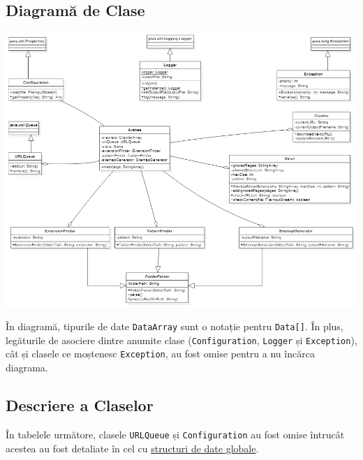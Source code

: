\documentclass[12pt]{article}
\begin{document}
\subsection{Diagramă de Clase}

\begin{center}
    \includegraphics[width=15cm]{Class Diagram.png}
\end{center}

În diagramă, tipurile de date \texttt{DataArray} sunt o notație pentru \texttt{Data[]}. În plus, legăturile de asociere dintre anumite clase (\texttt{Configuration}, \texttt{Logger} și \texttt{Exception}), cât și clasele ce moștenesc \texttt{Exception}, au fost omise pentru a nu încărca diagrama. \\

\newpage

\subsection{Descriere a Claselor}

În tabelele următore, clasele \texttt{URLQueue} și \texttt{Configuration} au fost omise întrucât acestea au fost detaliate în cel cu \hyperlink{data_structures_link}{structuri de date globale}.
\end{document}
